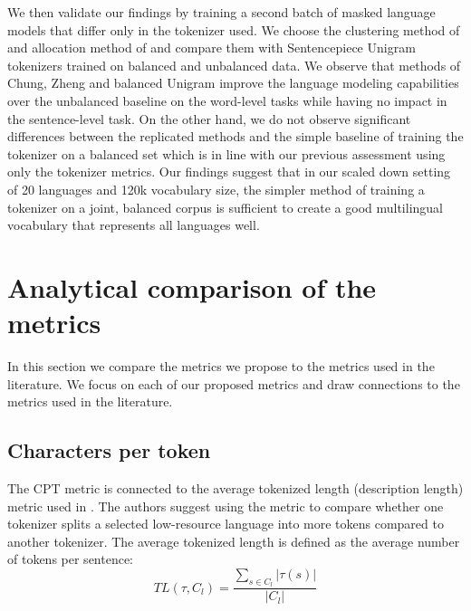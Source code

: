 We then validate our findings by training a second batch of masked language models that differ only in the tokenizer used. We choose the clustering method of \citet{chung_improving_2020} and allocation method of \citet{zheng_allocating_2021} and compare them with Sentencepiece Unigram tokenizers trained on balanced and unbalanced data. We observe that methods of Chung, Zheng and balanced Unigram improve the language modeling capabilities over the unbalanced baseline on the word-level tasks while having no impact in the sentence-level task. On the other hand, we do not observe significant differences between the replicated methods and the simple baseline of training the tokenizer on a balanced set which is in line with our previous assessment using only the tokenizer metrics. Our findings suggest that in our scaled down setting of 20 languages and 120k vocabulary size, the simpler method of training a tokenizer on a joint, balanced corpus is sufficient to create a good multilingual vocabulary that represents all languages well.

\section{Analytical comparison of the metrics}

In this section we compare the metrics we propose to the metrics used in the literature. We focus on each of our proposed metrics and draw connections to the metrics used in the literature.

\subsection{Characters per token}

The CPT metric is connected to the average tokenized length (description length) metric used in \citet{chung_improving_2020,liang_xlm-v_2023}. The authors suggest using the metric to compare whether one tokenizer splits a selected low-resource language into more tokens compared to another tokenizer. The average tokenized length is defined as the average number of tokens per sentence: 
\begin{equation}
    TL(\tau, C_l) = \frac{\sum_{s \in C_l}|\tau(s)|}{|C_l|}
\end{equation}

